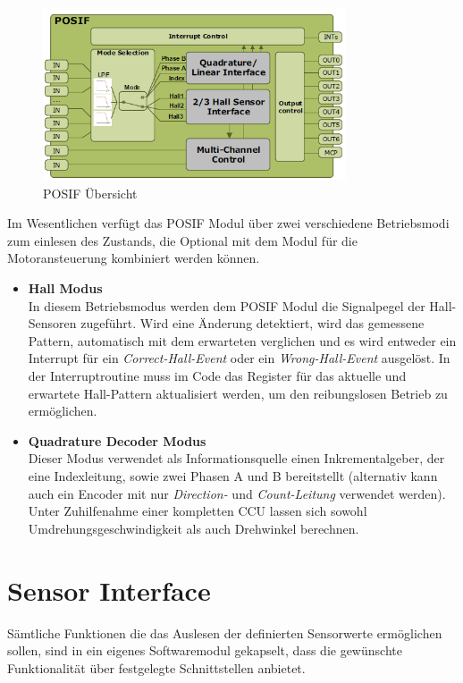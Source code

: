 \begin{figure}[h]
\centering
\includegraphics[width=0.8\textwidth]{sensor/posif_overview.PNG}
\caption{POSIF Übersicht}
\label{img:posif_overview}
\end{figure}

Im Wesentlichen verfügt das POSIF Modul über zwei verschiedene Betriebsmodi zum einlesen des Zustands, die Optional mit dem Modul für die Motoransteuerung kombiniert werden können.

\begin{itemize}
\item \textbf{Hall Modus} \\
In diesem Betriebsmodus werden dem POSIF Modul die Signalpegel der Hall-Sensoren zugeführt. Wird eine Änderung detektiert, wird das gemessene Pattern, automatisch mit dem erwarteten verglichen und es wird entweder ein Interrupt für ein \textit{Correct-Hall-Event} oder ein \textit{Wrong-Hall-Event} ausgelöst. In der Interruptroutine muss im Code das Register für das aktuelle und erwartete Hall-Pattern aktualisiert werden, um den reibungslosen Betrieb zu ermöglichen.
\item \textbf{Quadrature Decoder Modus} \\
Dieser Modus verwendet als Informationsquelle einen Inkrementalgeber, der eine Indexleitung, sowie zwei Phasen A und B bereitstellt (alternativ kann auch ein Encoder mit nur \textit{Direction-} und \textit{Count-Leitung} verwendet werden). Unter Zuhilfenahme einer kompletten CCU lassen sich sowohl Umdrehungsgeschwindigkeit als auch Drehwinkel berechnen.
\end{itemize}

\section{Sensor Interface}
Sämtliche Funktionen die das Auslesen der definierten Sensorwerte ermöglichen sollen, sind in ein eigenes Softwaremodul gekapselt, dass die gewünschte Funktionalität über festgelegte Schnittstellen anbietet. \\

